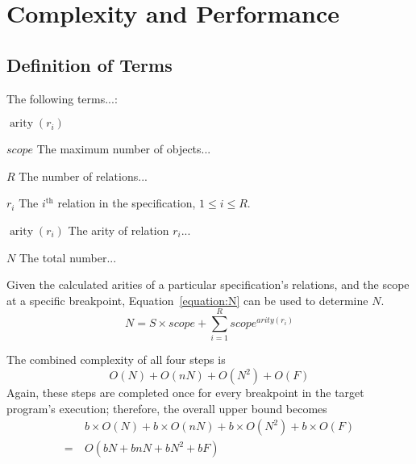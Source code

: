 \section{Complexity and Performance}\label{sec:EmbeeComplexity}

\subsection{Definition of Terms}\label{sec:termDefn}

    The following terms...:

    \begin{Ventry}{\boldmath $\operatorname{arity}(r_i)$ \unboldmath}

        \boldmath \item[$scope$] \unboldmath
        The maximum number of objects...

        \boldmath \item[$R$] \unboldmath
        The number of relations...

        \boldmath \item[$r_i$] \unboldmath
        The $i^\text{th}$ relation in the specification, $1 \le i \le R$.

        \boldmath \item[$\operatorname{arity}(r_i)$] \unboldmath
        The arity of relation $r_i$...

        \boldmath \item[$N$] \unboldmath The total number...

        Given the calculated arities of a particular specification's relations, and the scope at
        a specific breakpoint, Equation~\ref{equation:N} can be used to determine $N$.
        \begin{equation}\label{equation:N}
        N = S \times scope + \sum_{i=1}^R scope ^ {arity(r_i)}
        \end{equation}

    \end{Ventry}



    The combined complexity of all four steps is
    \begin{equation*}
        O(N) + O(nN) + O(N^2) + O(F)
    \end{equation*}
    Again, these steps are completed once for every breakpoint in the target program's
    execution; therefore, the overall upper bound becomes
    \begin{equation*}
    \begin{split}
        & b \times O(N) + b \times O(nN) + b \times O(N^2) + b \times  O(F) \\
                   = ~ & O(bN + bnN + bN^2 + bF)
    \end{split}
    \end{equation*}


